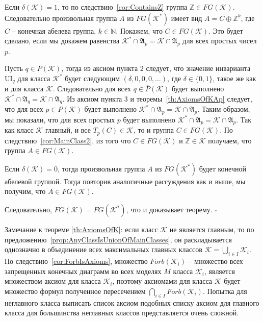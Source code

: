 \documentclass[a4paper,11pt,twoside]{article}
\def\A{{\mathfrak{A}}}
\def\K{{\mathcal{K}}}
\def\Z{{\mathbb{Z}}}
\def\N{{\mathbb{N}}}
\def\ui{{\mathrm{UI}}}
\begin{document}
Если $\delta(\K) = 1$, то по следствию~\ref{cor:ContainsZ} группа $\Z \in FG(\K)$. Следовательно произвольная группа $A$ из $FG(\K^*)$ имеет вид $A = C \oplus \Z^k$, где $C$ -- конечная абелева группа, $k \in \N$. Покажем, что $C \in FG(\K)$. Это будет сделано, если мы докажем равенства $\K^* \cap \A_p = \K \cap \A_p$ для всех простых чисел $p$.

Пусть $q \in \overline{P}(\K)$, тогда из аксиом пункта 2 следует, что значение инварианта $\ui_q$ для класса $\K^*$ будет следующим $(\delta, 0, 0, 0, \ldots)$, где $\delta \in \{0, 1\}$, такое же как и для класса $\K$. Следовательно для всех $q \in \overline{P}(\K)$ будет выполнено $\K^* \cap \A_q = \K \cap \A_q.$ Из аксиом пункта 3 и теоремы~\ref{th:AxiomsOfKAp} следует, что для всех $p \in P(\K)$ будет выполнено $\K^* \cap \A_p = \K \cap \A_p.$ Таким образом, мы показали, что для всех простых $p$ будет выполнено $\K^* \cap \A_p = \K \cap \A_p.$ Так как класс $\K$ главный, и все $T_p(C) \in \K$, то и группа $C \in FG(\K)$. По следствию~\ref{cor:MainClass2}, из того что $C \in FG(\K)$ и $\Z \in \K$ получаем, что группа $A \in FG(\K).$

Если $\delta(\K) = 0$, тогда произвольная группа $A$ из $FG(\K^*)$ будет конечной абелевой группой. Тогда повторив аналогичные рассуждения как и выше, мы получим, что $A \in FG(\K)$.

Следовательно, $FG(\K) = FG(\K^*)$, что и доказывает теорему. $\square$

Замечание к теореме \ref{th:AxiomsOfK}: если класс $\K$ не является главным, то по предложению~\ref{prop:AnyClassIsUnionOfMainClasses}, он раскладывается однозначно в объединение всех максимальных главных классов $\K = \bigcup\limits_{i \in I} \K_i$. По следствию~\ref{cor:ForbIsAxioms}, множество $Forb(\K_i)$ -- множество всех запрещенных конечных диаграмм во всех моделях $M$ класса $\K_i$, является множеством аксиом для класса $\K_i$, поэтому аксиомами для класса $\K$ будет множество формул полученное пересечением $\bigcap\limits_{i \in I} Forb(\K_i)$. Попытка для неглавного класса выписать список аксиом подобных списку аксиом для главного класса для большинства неглавных классов представляется очень сложной.
\end{document}
